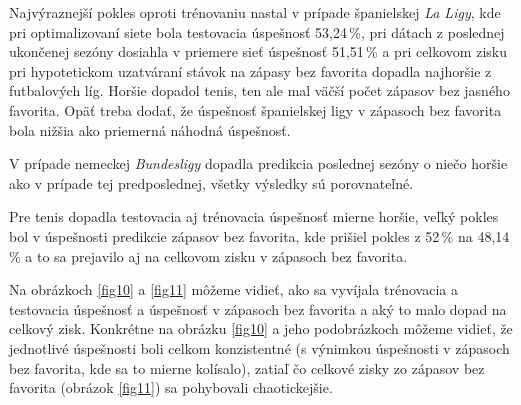 Najvýraznejší pokles oproti trénovaniu nastal v prípade španielskej \textit{La Ligy}, kde pri optimalizovaní siete bola testovacia úspešnosť 53,24\,\%, pri dátach z poslednej ukončenej sezóny dosiahla v priemere sieť úspešnosť 51,51\,\% a pri celkovom zisku pri hypotetickom uzatváraní stávok na zápasy bez favorita dopadla najhoršie z futbalových líg.
Horšie dopadol tenis, ten ale mal väčší počet zápasov bez jasného favorita.
Opäť treba dodať, že úspešnosť španielskej ligy v zápasoch bez favorita bola nižšia ako priemerná náhodná úspešnosť.

V prípade nemeckej \textit{Bundesligy} dopadla pre\-dikcia poslednej sezóny o niečo horšie ako v prípade tej predposlednej, všetky výsledky sú porovnateľné.

Pre tenis dopadla testovacia aj trénovacia úspešnosť mierne horšie, veľký pokles bol v úspešnosti pre\-dikcie zápasov bez favorita, kde prišiel pokles z 52\,\% na 48,14\,\% a to sa prejavilo aj na celkovom zisku v zápasoch bez favorita.

Na obrázkoch \ref{fig10} a \ref{fig11} môžeme vidieť, ako sa vyvíjala trénovacia a testovacia úspešnosť a úspešnosť v zápasoch bez favorita a aký to malo dopad na celkový zisk. Konkrétne na obrázku \ref{fig10} a jeho podobrázkoch môžeme vidieť, že jednotlivé úspešnosti boli celkom konzistentné (s výnimkou úspešnosti v zápasoch bez favorita, kde sa to mierne kolísalo), zatiaľ čo celkové zisky zo zápasov bez favorita (obrázok \ref{fig11}) sa pohybovali chaotickejšie.


